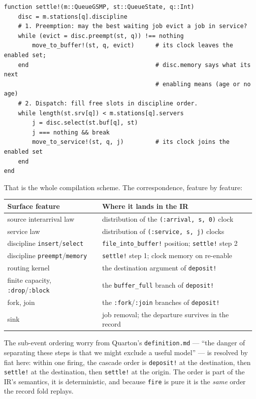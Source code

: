 \documentclass[11pt]{article}
\newcommand{\code}[1]{\texttt{#1}}
\begin{document}
\begin{lstlisting}
function settle!(m::QueueGSMP, st::QueueState, q::Int)
    disc = m.stations[q].discipline
    # 1. Preemption: may the best waiting job evict a job in service?
    while (evict = disc.preempt(st, q)) !== nothing
        move_to_buffer!(st, q, evict)      # its clock leaves the enabled set;
    end                                    # disc.memory says what its next
                                           # enabling means (age or no age)
    # 2. Dispatch: fill free slots in discipline order.
    while length(st.srv[q]) < m.stations[q].servers
        j = disc.select(st.buf[q], st)
        j === nothing && break
        move_to_service!(st, q, j)         # its clock joins the enabled set
    end
end
\end{lstlisting}

That is the whole compilation scheme. The correspondence, feature by feature:

\begin{center}
\small
\begin{tabular}{@{}ll@{}}
\toprule
Surface feature & Where it lands in the IR \\
\midrule
source interarrival law & distribution of the \code{(:arrival, s, 0)} clock \\
service law & distribution of \code{(:service, s, j)} clocks \\
discipline \code{insert}/\code{select} & \code{file\_into\_buffer!} position; \code{settle!} step 2 \\
discipline \code{preempt}/\code{memory} & \code{settle!} step 1; clock memory on re-enable \\
routing kernel & the destination argument of \code{deposit!} \\
finite capacity, \code{:drop}/\code{:block} & the \code{buffer\_full} branch of \code{deposit!} \\
fork, join & the \code{:fork}/\code{:join} branches of \code{deposit!} \\
sink & job removal; the departure survives in the record \\
\bottomrule
\end{tabular}
\end{center}

The sub-event ordering worry from Quarton's \code{definition.md} --- ``the
danger of separating these steps is that we might exclude a useful model'' ---
is resolved by fiat here: within one firing, the cascade order is
\code{deposit!} at the destination, then \code{settle!} at the destination,
then \code{settle!} at the origin. The order is part of the IR's semantics, it
is deterministic, and because \code{fire} is pure it is the \emph{same} order
the record fold replays.
\end{document}
